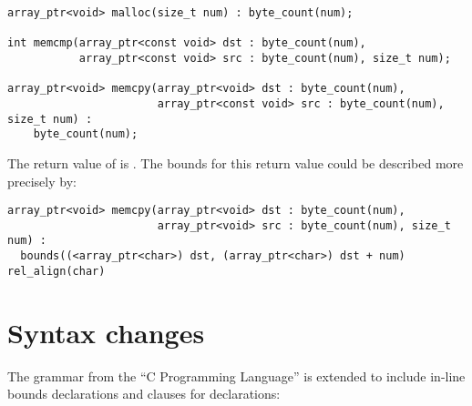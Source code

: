 \begin{lstlisting}
array_ptr<void> malloc(size_t num) : byte_count(num);

int memcmp(array_ptr<const void> dst : byte_count(num),
           array_ptr<const void> src : byte_count(num), size_t num);

array_ptr<void> memcpy(array_ptr<void> dst : byte_count(num),
                       array_ptr<const void> src : byte_count(num), size_t num) :
    byte_count(num);
\end{lstlisting}

The return value of  is . The bounds for
this return value could be described more precisely by:

\begin{lstlisting}
array_ptr<void> memcpy(array_ptr<void> dst : byte_count(num),
                       array_ptr<void> src : byte_count(num), size_t num) :
  bounds((<array_ptr<char>) dst, (array_ptr<char>) dst + num) rel_align(char)
\end{lstlisting}
\section{Syntax changes}
The grammar from the ``C Programming Language'' \cite{Ritchie1988} is extended to include
in-line bounds declarations and  clauses for declarations:

